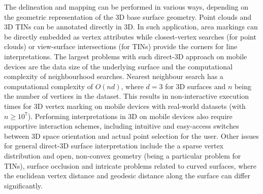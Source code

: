 \documentclass[review]{elsarticle}
\begin{document}

The delineation and mapping can be performed in various ways, depending on the geometric representation of the 3D base surface geometry. Point clouds and 3D \glspl{TIN} can be annotated directly in 3D. In such application, area markings can be directly embedded as vertex attributes while closest-vertex searches (for point clouds) or view-surface intersections (for \glspl{TIN}) provide the corners for line interpretations. The largest problems with such direct-3D approach on mobile devices are the data size of the underlying surface and the computational complexity of neighbourhood searches. Nearest neighbour search has a computational complexity of $O(nd)$, where $d=3$ for 3D surfaces and $n$ being the number of vertices in the dataset. This results in non-interactive execution times for 3D vertex marking on mobile devices with real-world datasets (with $n \geq 10^7$). Performing interpretations in 3D on mobile devices also require supportive interaction schemes, including intuitive and easy-access switches between 3D space orientation and actual point selection for the user. Other issues for general direct-3D surface interpretation include the a sparse vertex distribution and open, non-convex geometry (being a particular problem for \glspl{TIN}), surface occlusion and intricate problems related to curved surfaces, where the euclidean vertex distance and geodesic distance along the surface can differ significantly. 
\end{document}
